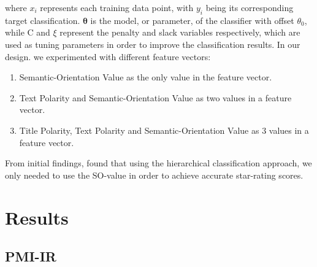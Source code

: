 \documentclass[11pt]{report} %
\begin{document}
	where $x_{i}$ represents each training data point, with $y_{i}$ being its corresponding target classification. $\mathbf{\theta}$ is the model, or parameter, of the classifier with offset $\theta_{0}$, while C and $\xi$ represent the penalty and slack variables respectively, which are used as tuning parameters in order to improve the classification results. In our design. we experimented with different feature vectors:

\begin{enumerate}
\item{Semantic-Orientation Value as the only value in the feature vector.}
\item {Text Polarity and Semantic-Orientation Value as two values in a feature vector.}
\item {Title Polarity, Text Polarity and Semantic-Orientation Value as 3 values in a feature vector.}
\end{enumerate}

From initial findings, found that using the hierarchical classification approach, we only needed to use the SO-value in order to achieve accurate star-rating scores. 

\chapter{Results}
\label{chapter:results}
	\section{PMI-IR}
\end{document}
